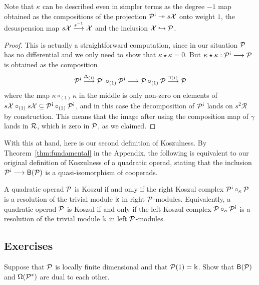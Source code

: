 Note that $\kappa$ can be described even in simpler terms as
the degree $-1$ map obtained as the compositions of the projection
$\PP^\antishriek \twoheadrightarrow s\XX$ onto weight $1$,
the desuspension map $s\mathcal{X}\stackrel{s^{-1}}\longrightarrow \mathcal{X}$
and the inclusion $\mathcal{X} \hookrightarrow {\mathcal{P}}$. 

\begin{proof}
This is actually a straightforward computation,
since in our situation ${\mathcal{P}}$ has no differential
and we only need to show that $\kappa\star \kappa = 0$. 
But $\kappa\star\kappa : \PP^\antishriek \longrightarrow \PP$
is obtained as the composition
\[
\PP^\antishriek\stackrel{\Delta_{(1)}}\longrightarrow 
 	\PP^\antishriek \circ_{(1)} 	\PP^\antishriek 
 	 \longrightarrow
 	 	\PP \circ_{(1)} 	\PP 
 	 		\stackrel{\gamma_{(1)}}\longrightarrow 
 	 		\PP
\]
where the map $\kappa\circ_{(1)} \kappa$ in the middle is only non-zero
on elements of $s\XX\circ_{(1)} s\XX \subseteq \PP^\antishriek\circ_{(1)} \PP^\antishriek$, and in this case the decomposition of $\PP^\antishriek$
lands on $s^2\mathcal R$ by construction. This means that
the image after using the composition map of $\gamma$ lands in $\mathcal{R}$,
which is zero in ${\mathcal{P}}$, as we claimed.
\end{proof}

With this at hand, here is our second definition of Koszulness.
By Theorem~\ref{thm:fundamental} in the Appendix, the following
is equivalent to our original definition of Koszulness of a quadratic
operad, stating that the inclusion $\PP^\antishriek \longrightarrow 
\B{\PP}$ is a quasi-isomorphism of cooperads. 

\begin{definition}
A quadratic operad ${\mathcal{P}}$ is Koszul if and only if the
right Koszul complex $\PP^\antishriek \circ_\kappa \PP$
is a resolution of the trivial module $\Bbbk$ in right
${\mathcal{P}}$-modules. Equivalently, 
a quadratic operad ${\mathcal{P}}$ is Koszul if and only if the
left Koszul complex $\PP \circ_\kappa \PP^\antishriek$
is a resolution of the trivial module $\Bbbk$ in left
${\mathcal{P}}$-modules.
\end{definition}

\subsection{Exercises}

\begin{question}
Suppose that ${\mathcal{P}}$ is locally finite dimensional and that ${\mathcal{P}}(1) = \Bbbk$. 
Show that $\mathsf{B}({\mathcal{P}})$ and $\Omega({\mathcal{P}}^*)$ are dual to each other.
\end{question}

